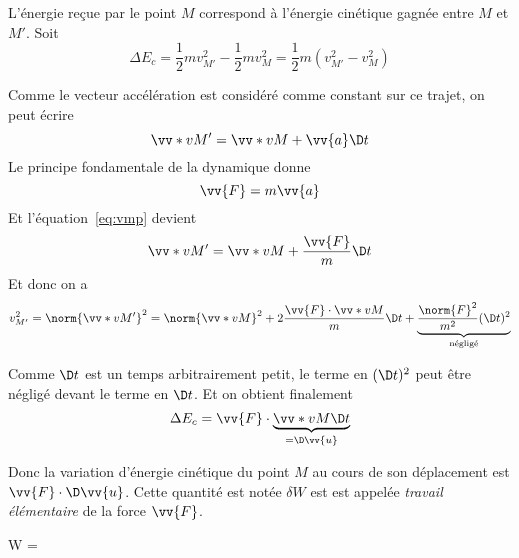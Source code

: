 \documentclass{cours}
\begin{document}
\begin{center}
  \end{center}

L'énergie reçue par le point $M$ correspond à l'énergie cinétique gagnée entre $M$ et $M'$. Soit
\begin{equation}
  \Delta E_c = \frac{1}{2}mv_{M'}^2 - \frac{1}{2}mv_M^2 = \frac{1}{2}m\left( v_{M'}^2 - v_M^2 \right)   
\end{equation}

Comme le vecteur accélération est considéré comme constant sur ce trajet, on peut écrire 
\begin{equation}
  \vv*{v}{M'} = \vv*{v}{M} + \vv{a}\D t 
  \label{eq:vmp}
\end{equation}
%
Le principe fondamentale de la dynamique donne 
\begin{equation}
\vv{F} = m\vv{a}
\end{equation}
%
Et l'équation~\eqref{eq:vmp} devient 
\begin{equation}
  \vv*{v}{M'} = \vv*{v}{M} + \frac{\vv{F}}{m}\D t
\end{equation}
%
Et donc on a 
\begin{equation}
  v_{M'}^2 = \norm{\vv*{v}{M'}}^2 = \norm{\vv*{v}{M}}^2 + 2\frac{\vv{F}\cdot\vv*{v}{M}}{m}\D t + \underbrace{\frac{\norm{F}^2}{m^2}(\D t)^2}_{\text{négligé}}
\end{equation}

Comme $\D t$ est un temps arbitrairement petit, le terme en $(\D t)^2$ peut être négligé devant le terme en $\D t$. Et on obtient finalement
\begin{equation}
  \Delta E_c = \vv{F}\cdot\underbrace{\vv*{v}{M}\D t}_{=\D \vv{u}}
\end{equation}

Donc la variation d'énergie cinétique du point $M$ au cours de son déplacement est $\vv{F}\cdot\D\vv{u}$. Cette quantité est notée $\delta W$ est est appelée \emph{travail élémentaire} de la force $\vv{F}$.

\begin{eqencadre}
\delta W = \cdot\D{}
\end{eqencadre}
\end{document}
